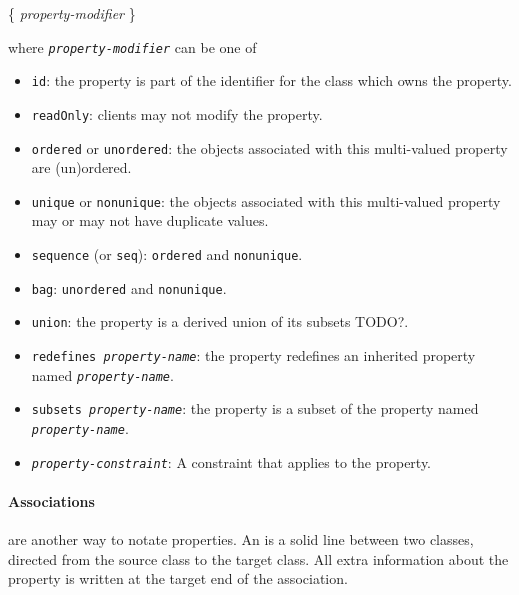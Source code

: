 \begin{itemize}
\begin{syntax}
\{ \textit{property-modifier}  \}
\end{syntax}
where \texttt{\textit{property-modifier}} can be one of
\begin{itemize}
\item \texttt{id}: the property is part of the identifier for the class which owns the property.
\item \texttt{readOnly}: clients may not modify the property.
\item \texttt{ordered} or \texttt{unordered}: the objects associated with this multi-valued property are (un)ordered.
\item \texttt{unique} or \texttt{nonunique}: the objects associated with this multi-valued property may or may not have duplicate values.
\item \texttt{sequence} (or \texttt{seq}): \texttt{ordered} and \texttt{nonunique}.
\item \texttt{bag}: \texttt{unordered} and \texttt{nonunique}.
\item \texttt{union}: the property is a derived union of its subsets TODO?.
\item \texttt{redefines \textit{property-name}}: the property redefines an inherited property named \texttt{\textit{property-name}}.
\item \texttt{subsets \textit{property-name}}: the property is a subset of the property named \texttt{\textit{property-name}}.
\item \texttt{\textit{property-constraint}}: A constraint that applies to the property.
\end{itemize}
\end{itemize}

\paragraph{Associations} are another way to notate properties. An  is a solid line between two classes, directed from the source class to the target class. All extra information about the property is written at the target end of the association.


